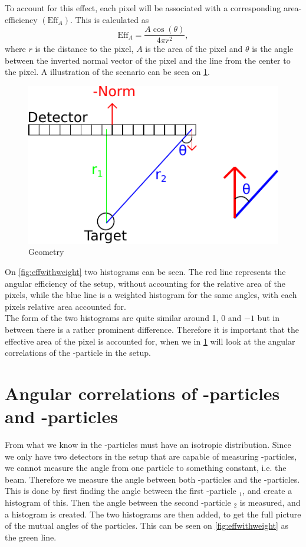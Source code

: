 To account for this effect, each pixel will be associated with a corresponding area-efficiency $(\text{Eff}_A)$.
This is calculated as 
\begin{equation}
\text{Eff}_A = \dfrac{A\cos(\theta) }{ 4 \pi r^2},
\end{equation}
where $r$ is the distance to the pixel, $A$ is the area of the pixel and $\theta$ is the angle between the inverted normal vector of the pixel and the line from the center to the pixel. A illustration of the scenario can be seen on \cref{fig:EffGeometry}.

\begin{figure}[H]
	\centering
	\includegraphics[width=.7\linewidth]{../figures/detektorEffDrawing.pdf}
	\caption{Geometry}
	\label{fig:EffGeometry}
\end{figure}

On \cref{fig:effwithweight} two histograms can be seen. The red line represents the angular efficiency of the setup, without accounting for the relative area of the pixels, while the blue line is a weighted histogram for the same angles, with each pixels relative area accounted for. \\
The form of the two histograms are quite similar around 1, 0 and $-1$ but in between there is a rather prominent difference. Therefore it is important that the effective area of the pixel is accounted for, when we in \cref{sec:betaAngle} will look at the angular correlations of the \be-particle in the setup. 



\section{Angular correlations of \al-particles and \be-particles}
\label{sec:betaAngle}
From what we know in  the \be-particles must have an isotropic distribution. Since we only have two detectors in the setup that are capable of measuring \be-particles, we cannot measure the angle from one particle to something constant, i.e. the beam. Therefore we measure the angle between both \al-particles and the \be-particles.
This is done by first finding the angle between the first \al-particle \al$_1$, and create a histogram of this. Then the angle between the second \al-particle \al$_2$ is measured, and a histogram is created. The two histograms are then added, to get the full picture of the mutual angles of the particles. 
This can be seen on \cref{fig:effwithweight} as the green line.  

